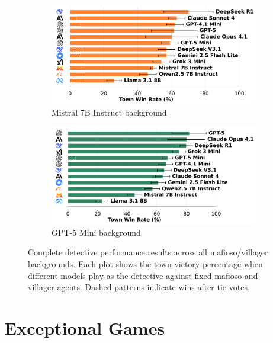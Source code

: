 \documentclass{article}
\begin{document}
\begin{figure}[htbp]
    \begin{subfigure}[b]{0.48\textwidth}
        \centering
        \includegraphics[width=\textwidth]{../results/detective_mistral_7b_instruct_db_benchmark.png}
        \caption{Mistral 7B Instruct background}
        \label{fig:detective_mistral_appendix}
    \end{subfigure}
    \hfill
    \begin{subfigure}[b]{0.48\textwidth}
        \centering
        \includegraphics[width=\textwidth]{../results/detective_gpt-5_mini_db_benchmark.png}
        \caption{GPT-5 Mini background}
        \label{fig:detective_gpt5mini_appendix}
    \end{subfigure}
    \caption{Complete detective performance results across all mafioso/villager backgrounds. Each plot shows the town victory percentage when different models play as the detective against fixed mafioso and villager agents. Dashed patterns indicate wins after tie votes.}
    \label{fig:detective_complete}
\end{figure}

\section{Exceptional Games}
\label{appendix:exceptional_games}
\end{document}
